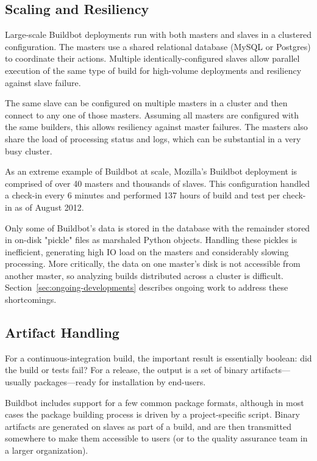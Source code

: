 \documentclass[conference]{IEEEtran}
\begin{document}
\subsection{Scaling and Resiliency}

Large-scale Buildbot deployments run with both masters and slaves in a clustered configuration.
The masters use a shared relational database (MySQL or Postgres) to coordinate their actions.
Multiple identically-configured slaves allow parallel execution of the same type of build for high-volume deployments and resiliency against slave failure.

The same slave can be configured on multiple masters in a cluster and then connect to any one of those masters.
Assuming all masters are configured with the same builders, this allows resiliency against master failures.
The masters also share the load of processing status and logs, which can be substantial in a very busy cluster.

As an extreme example of Buildbot at scale, Mozilla's Buildbot deployment is comprised of over 40 masters and thousands of slaves.
This configuration handled a check-in every 6 minutes and performed 137 hours of build and test per check-in as of August 2012\cite{mozilla-load}.

Only some of Buildbot's data is stored in the database with the remainder stored in on-disk "pickle" files as marshaled Python objects.
Handling these pickles is inefficient, generating high IO load on the masters and considerably slowing processing.
More critically, the data on one master's disk is not accessible from another master, so analyzing builds distributed across a cluster is difficult.
Section~\ref{sec:ongoing-developments} describes ongoing work to address these shortcomings.

\subsection{Artifact Handling}

For a continuous-integration build, the important result is essentially boolean: did the build or tests fail?
For a release, the output is a set of binary artifacts---usually packages---ready for installation by end-users.

Buildbot includes support for a few common package formats, although in most cases the package building process is driven by a project-specific script.
Binary artifacts are generated on slaves as part of a build, and are then transmitted somewhere to make them accessible to users (or to the quality assurance team in a larger organization).
\end{document}
